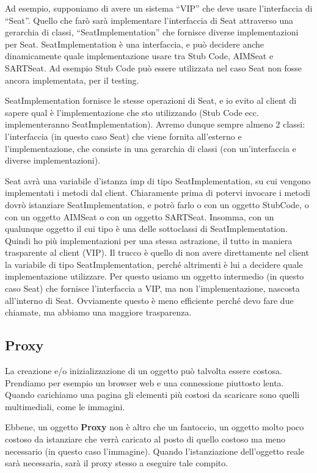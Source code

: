             Ad esempio, supponiamo di avere un sistema “VIP” che deve usare l’interfaccia di “Seat”. Quello che farò sarà implementare l’interfaccia di Seat attraverso una gerarchia di classi, “SeatImplementation” che fornisce diverse implementazioni per Seat. SeatImplementation è una interfaccia, e può decidere anche dinamicamente quale implementazione usare tra Stub Code, AIMSeat e SARTSeat. Ad esempio Stub Code può essere utilizzata nel caso Seat non fosse ancora implementata, per il testing. 

            SeatImplementation fornisce le stesse operazioni di Seat, e io evito al client di sapere qual è l’implementazione che sto utilizzando (Stub Code ecc. implementeranno SeatImplementation). Avremo dunque sempre almeno 2 classi: l’interfaccia (in questo caso Seat) che viene fornita all’esterno e l’implementazione, che consiste in una gerarchia di classi (con un’interfaccia e diverse implementazioni). 

            Seat avrà una variabile d’istanza imp di tipo SeatImplementation, su cui vengono implementati i metodi dal client. Chiaramente prima di potervi invocare i metodi dovrò istanziare SeatImplementation, e potrò farlo o con un oggetto StubCode, o con un oggetto AIMSeat o con un oggetto SARTSeat. Insomma, con un qualunque oggetto il cui tipo è una delle sottoclassi di SeatImplementation. Quindi ho più implementazioni per una stessa astrazione, il tutto in maniera trasparente al client (VIP). Il trucco è quello di non avere direttamente nel client la variabile di tipo SeatImplementation, perché altrimenti è lui a decidere quale implementazione utilizzare. Per questo usiamo un oggetto intermedio (in questo caso Seat) che fornisce l’interfaccia a VIP, ma non l’implementazione, nascosta all’interno di Seat. Ovviamente questo è meno efficiente perché devo fare due chiamate, ma abbiamo una maggiore trasparenza.
            
        \subsection{Proxy}
            La creazione e/o inizializzazione di un oggetto può talvolta essere costosa. Prendiamo per esempio un browser web e una connessione piuttosto lenta. Quando carichiamo una pagina gli elementi più costosi da scaricare sono quelli multimediali, come le immagini.
            
            Ebbene, un oggetto \textbf{Proxy} non è altro che un fantoccio, un oggetto molto poco costoso da istanziare che verrà caricato al posto di quello costoso ma meno necessario (in questo caso l'immagine). Quando l'istanziazione dell'oggetto reale sarà necessaria, sarà il proxy stesso a eseguire tale compito.
            
